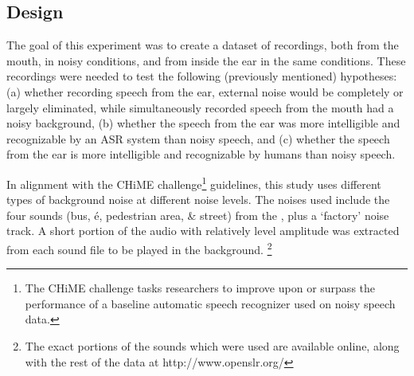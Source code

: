 \subsection{Design}
\DIFdelbegin %
\DIFdelend \DIFaddbegin \label{chap2:methods:design}
   \DIFaddend 

The goal of this experiment was to create a dataset of recordings, both from the mouth, in noisy conditions, and from inside the ear in the same conditions.  These recordings were needed to test the following (previously mentioned) hypotheses: (a) whether recording speech from the ear, external noise would be completely or largely eliminated, while simultaneously recorded speech from the mouth had a noisy background, (b) whether the speech from the ear was more intelligible and recognizable by an ASR system than noisy speech, and (c) whether the speech from the ear is more intelligible and recognizable by humans than noisy speech. 

In alignment with the CHiME challenge\footnote{The CHiME challenge tasks researchers to improve upon or surpass the performance of a baseline automatic speech recognizer used on noisy speech data.} guidelines, this study uses different types of background noise at different noise levels.  The noises used include the four sounds (bus, \DIFdelbegin {}\DIFdelend \DIFaddbegin {}\'{e}\DIFaddend , pedestrian area, \& street) from the \cite{chime:16}, plus a `factory' noise track.  A short portion of the audio with relatively level amplitude was extracted from each sound file to be played in the background.  \DIFaddbegin {}\DIFaddend \footnote{\DIFdelbegin {}\DIFdelend The exact portions of the sounds which were used are available online, along with the rest of the data at http://www.openslr.org/\DIFdelbegin {}\DIFdelend }

